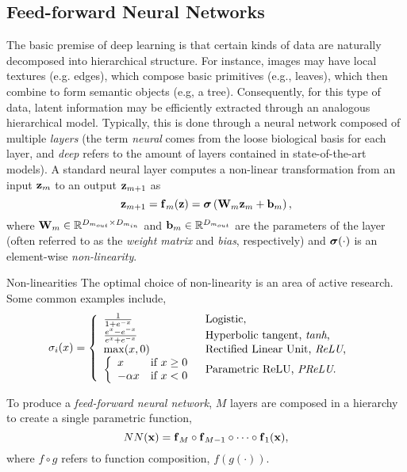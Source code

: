 \subsection{Feed-forward Neural Networks} 
The basic premise of deep learning is that certain kinds of data are naturally decomposed into hierarchical structure. For instance, images may have local textures (e.g. edges), which compose basic primitives (e.g., leaves), which then combine to form semantic objects (e.g, a tree). Consequently, for this type of data, latent information may be efficiently extracted through an analogous hierarchical model.  Typically, this is done through a neural network composed of multiple \textit{layers} (the term \textit{neural} comes from the loose biological basis for each layer, and \textit{deep} refers to the amount of layers contained in state-of-the-art models). A standard neural layer computes a non-linear transformation from an input $\boldsymbol{\mathbf{z}}_m$ to an output $\boldsymbol{\mathbf{z}}_{m+1}$ as  
\begin{equation}
\boldsymbol{\mathbf{z}}_{m+1} = \boldsymbol{\mathbf{f}}_m(\boldsymbol{\mathbf{z}}) = \boldsymbol{\mathbf{\sigma}}\left(\boldsymbol{\mathbf{W}}_m\boldsymbol{\mathbf{z}}_m + \boldsymbol{\mathbf{b}}_m\right),
\end{equation}
where $\boldsymbol{\mathbf{W}}_m \in \mathbb{R}^{D_{m_{out}} \times D_{m_{in}}}$ and $\boldsymbol{\mathbf{b}}_m \in \mathbb{R}^{D_{m_{out}}}$ are the parameters of the layer (often referred to as the \textit{weight matrix} and \textit{bias}, respectively) and $\boldsymbol{\mathbf{\sigma}}(\cdot)$ is an element-wise \textit{non-linearity}.

\begin{remark}{Non-linearities}
	The optimal choice of non-linearity is an area of active research. Some common examples include,
	\begin{align}
\sigma_i(x) &= \left\{  	\begin{array}{ll}
		 \frac{1}{1+e^{-x}}   & \mbox{Logistic,} \\
		 \frac{e^x - e^{-x}}{e^x + e^{-x}}  & \mbox{Hyperbolic tangent, \textit{tanh},} \\
		 \max(x, 0)  & \mbox{Rectified Linear Unit, \textit{ReLU},} \\
		\left\{  	\begin{array}{ll}  x & \mbox{if} ~x \geq 0 \\
										-\alpha x & \mbox{if} ~ x < 0 \end{array}
		\right.   & \mbox{Parametric ReLU, \textit{PReLU}.} \end{array}\right.
\end{align}
\end{remark}
To produce a \textit{feed-forward neural network}, $M$ layers are composed in a hierarchy to create a single parametric function,
\begin{equation}
 NN(\boldsymbol{\mathbf{x}}) = \boldsymbol{\mathbf{f}}_M \circ \boldsymbol{\mathbf{f}}_{M-1} \circ \cdots \circ \boldsymbol{\mathbf{f}}_{1}(\boldsymbol{\mathbf{x}}),
\end{equation}
where $f \circ g$ refers to function composition, $f (g(\cdot))$.


